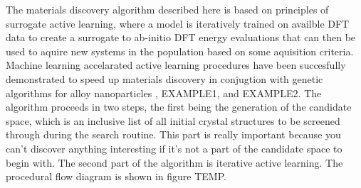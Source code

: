 

The materials discovery algorithm described here is based on principles of surrogate active learning,
where a model is iteratively trained on availble DFT data to create a surrogate to ab-initio DFT energy evaluations that can then be used to aquire new systems in the population based on some aquisition criteria.
%
Machine learning accelarated active learning procedures have been succesfully demonstrated to speed up materials discovery in conjugtion with genetic algorithms for alloy nanoparticles \cite{Jennings2019}, EXAMPLE1, and EXAMPLE2.
The algorithm proceeds in two steps, the first being the generation of the candidate space,
which is an inclusive list of all initial crystal structures to be screened through during the search routine.
%
This part is really important because you can't discover anything interesting if it's not a part of the candidate space to begin with.
The second part of the algorithm is iterative active learning.
The procedural flow diagram is shown in figure TEMP.


